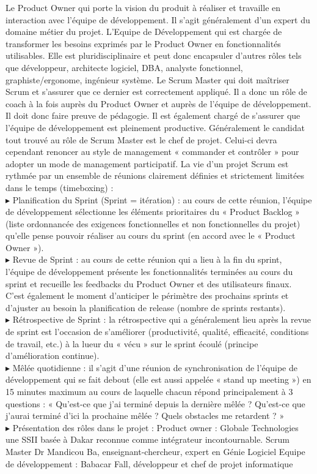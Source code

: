 \documentclass[a4paper, 12pt]{report}
\begin{document}
\noindent Le Product Owner qui porte la vision du produit à réaliser et travaille en interaction avec l’équipe de développement. Il s’agit généralement d’un expert du domaine métier du projet. 
L’Equipe de Développement qui est chargée de transformer les besoins exprimés par le Product Owner en fonctionnalités utilisables. Elle est pluridisciplinaire et peut donc encapsuler d’autres rôles tels que développeur, architecte logiciel, DBA, analyste fonctionnel, graphiste/ergonome, ingénieur système. 
Le Scrum Master qui doit maîtriser Scrum et s’assurer que ce dernier est correctement appliqué. Il a donc un rôle de coach à la fois auprès du Product Owner et auprès de l’équipe de développement. Il doit donc faire preuve de pédagogie. Il est également chargé de s’assurer que l’équipe de développement est pleinement productive. Généralement le candidat tout trouvé au rôle de Scrum Master est le chef de projet. Celui-ci devra cependant renoncer au style de management « commander et contrôler » pour adopter un mode de management participatif. 
La vie d’un projet Scrum est rythmée par un ensemble de réunions clairement définies et strictement limitées dans le temps (timeboxing) : 
\\
\noindent
$\blacktriangleright$ Planification du Sprint (Sprint = itération) : au cours de cette réunion, l’équipe de développement sélectionne les éléments prioritaires du « Product Backlog » (liste ordonnancée des exigences fonctionnelles et non fonctionnelles du projet) qu’elle pense pouvoir réaliser au cours du sprint (en accord avec le « Product Owner »). 
\\
\noindent
$\blacktriangleright$ Revue de Sprint : au cours de cette réunion qui a lieu à la fin du sprint, l’équipe de développement présente les fonctionnalités terminées au cours du sprint et recueille les feedbacks du Product Owner et des utilisateurs finaux. C’est également le moment d’anticiper le périmètre des prochains sprints et d’ajuster au besoin la planification de release (nombre de sprints restants). 
\\
\noindent
$\blacktriangleright$ Rétrospective de Sprint : la rétrospective qui a généralement lieu après la revue de sprint est l’occasion de s’améliorer (productivité, qualité, efficacité, conditions de travail, etc.) à la lueur du « vécu » sur le sprint écoulé (principe d’amélioration continue). 
\\
\noindent
$\blacktriangleright$ Mêlée quotidienne : il s’agit d’une réunion de synchronisation de l’équipe de développement qui se fait debout (elle est aussi appelée « stand up meeting ») en 15 minutes maximum au cours de laquelle chacun répond principalement à 3 questions : « Qu’est-ce que j’ai terminé depuis la dernière mêlée ? Qu’est-ce que j’aurai terminé d’ici la prochaine mêlée ? Quels obstacles me retardent ? » 
\\
\noindent
$\blacktriangleright$ Présentation des rôles dans le projet : 
Product owner : 
Globale Technologies une SSII basée à Dakar reconnue comme intégrateur incontournable.
Scrum Master 
Dr Mandicou Ba, enseignant-chercheur, expert en Génie Logiciel
Equipe de développement : 
Babacar Fall, développeur et chef de projet informatique
\end{document}
